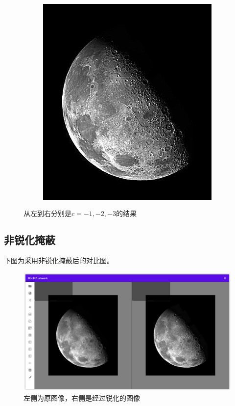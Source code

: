 \documentclass{article}
\begin{document}
\begin{figure}[htbp]
\begin{subfigure}{.32\textwidth}
    \end{subfigure}
    \begin{subfigure}{.32\textwidth}
        \includegraphics[width=\linewidth]{img/laplace/3.png}
    \end{subfigure}
    \caption{从左到右分别是$c=-1, -2, -3$的结果}
\end{figure}

\newpage

\subsection{非锐化掩蔽}

下图为采用非锐化掩蔽后的对比图。

\begin{figure}[H]
    \includegraphics[width=\textwidth]{img/usm.png}
    \caption{左侧为原图像，右侧是经过锐化的图像}
\end{figure}
\end{document}
